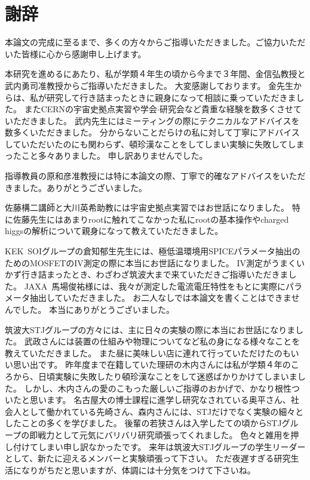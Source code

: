 \chapter*{謝辞}
本論文の完成に至るまで、多くの方々からご指導いただきました。ご協力いただいた皆様に心から感謝申し上げます。

本研究を進めるにあたり、私が学類４年生の頃から今まで３年間、金信弘教授と武内勇司准教授からご指導いただきました。
大変感謝しております。
金先生からは、私が研究して行き詰まったときに親身になって相談に乗っていただきました。
またCERNの宇宙史拠点実習や学会$\cdot$研究会など貴重な経験を数多くさせていただきました。
武内先生にはミーティングの際にテクニカルなアドバイスを数多くいただきました。
分からないことだらけの私に対して丁寧にアドバイスしていただいたのにも関わらず、頓珍漢なことをしてしまい実験に失敗してしまったこと多々ありました。
申し訳ありませんでした。

指導教員の原和彦准教授には特に本論文の際、丁寧で的確なアドバイスをいただきました。ありがとうございました。

佐藤構二講師と大川英希助教には宇宙史拠点実習ではお世話になりました。
特に佐藤先生にはあまりrootに触れてこなかった私にrootの基本操作やcharged higgsの解析について親身になって教えていただきました。

KEK\ SOIグループの倉知郁生先生には、極低温環境用SPICEパラメータ抽出のためのMOSFETのIV測定の際に本当にお世話になりました。
IV測定がうまくいかず行き詰まったとき、わざわざ筑波大まで来ていただきご指導いただきました。
JAXA\ 馬場俊祐様には、我々が測定した電流電圧特性をもとに実際にパラメータ抽出していただきました。
お二人なしでは本論文を書くことはできませんでした。
本当にありがとうございました。

筑波大STJグループの方々には、主に日々の実験の際に本当にお世話になりました。
武政さんには装置の仕組みや物理についてなど私の身になる様々なことを教えていただきました。
また昼に美味しい店に連れて行っていただけたのもいい思い出です。
昨年度まで在籍していた理研の木内さんには私が学類４年のころから、日頃実験に失敗したり頓珍漢なことをして迷惑ばかりかけてしまいました。
しかし、木内さんの愛のこもった厳しいご指導のおかげで、かなり根性ついたと思います。
名古屋大の博士課程に進学し研究なされている奥平さん、社会人として働かれている先崎さん、森内さんには、STJだけでなく実験の細々としたことの多くを学びました。
後輩の若狭さんは入学したての頃からSTJグループの即戦力として元気にバリバリ研究頑張ってくれました。
色々と雑用を押し付けてしまい申し訳なかったです。
来年は筑波大STJグループの学生リーダーとして、新たに迎えるメンバーと実験頑張って下さい。
ただ夜遅すぎる研究生活になりがちだと思いますが、体調には十分気をつけて下さいね。

